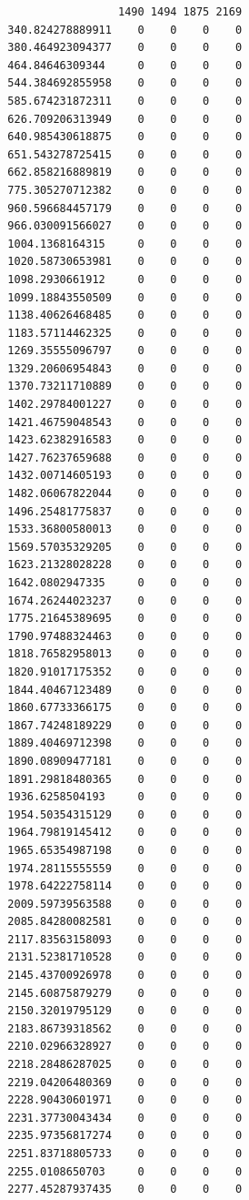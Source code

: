 \documentclass[
  letterpaper,
  DIV=11,
  numbers=noendperiod]{scrartcl}
\begin{document}
\begin{verbatim}
                   1490 1494 1875 2169
  340.824278889911    0    0    0    0
  380.464923094377    0    0    0    0
  464.84646309344     0    0    0    0
  544.384692855958    0    0    0    0
  585.674231872311    0    0    0    0
  626.709206313949    0    0    0    0
  640.985430618875    0    0    0    0
  651.543278725415    0    0    0    0
  662.858216889819    0    0    0    0
  775.305270712382    0    0    0    0
  960.596684457179    0    0    0    0
  966.030091566027    0    0    0    0
  1004.1368164315     0    0    0    0
  1020.58730653981    0    0    0    0
  1098.2930661912     0    0    0    0
  1099.18843550509    0    0    0    0
  1138.40626468485    0    0    0    0
  1183.57114462325    0    0    0    0
  1269.35555096797    0    0    0    0
  1329.20606954843    0    0    0    0
  1370.73211710889    0    0    0    0
  1402.29784001227    0    0    0    0
  1421.46759048543    0    0    0    0
  1423.62382916583    0    0    0    0
  1427.76237659688    0    0    0    0
  1432.00714605193    0    0    0    0
  1482.06067822044    0    0    0    0
  1496.25481775837    0    0    0    0
  1533.36800580013    0    0    0    0
  1569.57035329205    0    0    0    0
  1623.21328028228    0    0    0    0
  1642.0802947335     0    0    0    0
  1674.26244023237    0    0    0    0
  1775.21645389695    0    0    0    0
  1790.97488324463    0    0    0    0
  1818.76582958013    0    0    0    0
  1820.91017175352    0    0    0    0
  1844.40467123489    0    0    0    0
  1860.67733366175    0    0    0    0
  1867.74248189229    0    0    0    0
  1889.40469712398    0    0    0    0
  1890.08909477181    0    0    0    0
  1891.29818480365    0    0    0    0
  1936.6258504193     0    0    0    0
  1954.50354315129    0    0    0    0
  1964.79819145412    0    0    0    0
  1965.65354987198    0    0    0    0
  1974.28115555559    0    0    0    0
  1978.64222758114    0    0    0    0
  2009.59739563588    0    0    0    0
  2085.84280082581    0    0    0    0
  2117.83563158093    0    0    0    0
  2131.52381710528    0    0    0    0
  2145.43700926978    0    0    0    0
  2145.60875879279    0    0    0    0
  2150.32019795129    0    0    0    0
  2183.86739318562    0    0    0    0
  2210.02966328927    0    0    0    0
  2218.28486287025    0    0    0    0
  2219.04206480369    0    0    0    0
  2228.90430601971    0    0    0    0
  2231.37730043434    0    0    0    0
  2235.97356817274    0    0    0    0
  2251.83718805733    0    0    0    0
  2255.0108650703     0    0    0    0
  2277.45287937435    0    0    0    0

\end{verbatim}
\end{document}
